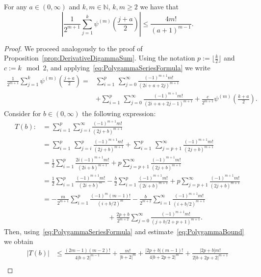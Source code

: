\documentclass[AHL,Unicode,longabstracts,published]{cedram}
\newcommand{\N}{\mathbb{N}}
\begin{document}
\begin{prop}\label{prop:DerivativeDigammaSumBound}
For any $a\in(0,\infty)$ and $k,m\in\N$, $k,m\ge 2$ we have that
\[
\left|\frac{1}{2^{m+1}}\sum\limits_{j=1}^k\psi^{(m)}\left(\frac{j+a}{2}\right)\right|\leq\frac{4m!}{(a+1)^{m-1}}.
\]
\end{prop}

\begin{proof}
We proceed analogously to the proof of Proposition~\ref{prop:DerivativeDigammaSum}. Using the notation $p:=\lfloor\frac{k}{2}\rfloor$ and $c:= k\mod 2$, and applying~\eqref{eq:PolygammaSeriesFormula} we write
\begin{align*}
\frac{1}{2^{m+1}}\sum\limits_{j=1}^k\psi^{(m)}\left(\frac{j+a}{2}\right)=&\sum\limits_{i=1}^p\,\sum\limits_{j=0}^{\infty}\frac{(-1)^{m+1}m!}{(2i+a+2j)^{m+1}}\\
&+\sum\limits_{i=1}^p\,\sum\limits_{j=0}^{\infty}\frac{(-1)^{m+1}m!}{(2i+a+2j-1)^{m+1}}+\frac{c}{2^{m+1}}\psi^{(m)}\left(\frac{k+a}{2}\right).
\end{align*}
Consider for $b\in(0,\infty)$ the following expression:
\begin{align*}
T(b):&=\sum\limits_{i=1}^p\sum\limits_{j=i}^{\infty}\frac{(-1)^{m+1}m!}{(2j+b)^{m+1}}\\
&=\sum\limits_{i=1}^p\,\sum\limits_{j=i}^{p}\frac{(-1)^{m+1}m!}{(2j+b)^{m+1}}+\sum\limits_{i=1}^p\,\sum\limits_{j=p+1}^{\infty}\frac{(-1)^{m+1}m!}{(2j+b)^{m+1}}\\
&=\frac12\sum\limits_{i=1}^p\frac{2i(-1)^{m+1}m!}{(2i+b)^{m+1}}+p\sum\limits_{j=p+1}^{\infty}\frac{(-1)^{m+1}m!}{(2j+b)^{m+1}}\\
&=\frac12\sum\limits_{i=1}^p\frac{(-1)^{m+1}m!}{(2i+b)^{m}}-\frac{b}{2}\sum\limits_{i=1}^p\frac{(-1)^{m+1}m!}{(2i+b)^{m+1}}+p\sum\limits_{j=p+1}^{\infty}\frac{(-1)^{m+1}m!}{(2j+b)^{m+1}}\\
&=-\frac{m}{2^{m+1}}\sum\limits_{i=1}^p\frac{(-1)^{m}(m-1)!}{(i+b/2)^m}-\frac{b}{2^{m+2}}\sum\limits_{i=1}^\infty\frac{(-1)^{m+1}m!}{(i+b/2)^{m+1}}\\
&\hspace{4cm}+\frac{2p+b}{2^{m+2}}\sum\limits_{j=0}^{\infty}\frac{(-1)^{m+1}m!}{(j+b/2+p+1)^{m+1}}.
\end{align*}
Then, using~\eqref{eq:PolygammaSeriesFormula} and estimate~\eqref{eq:PolygammaBound} we obtain
\begin{align*}
\left|T(b)\right|&\leq\frac{(2m-1)(m-2)!}{4|b+2|^{m-1}}+\frac{m!}{|b+2|^{m}}+\frac{|2p+b|(m-1)!}{4|b+2p+2|^{m}}+\frac{|2p+b|m!}{2|b+2p+2|^{m+1}}\\

\end{align*}
\end{proof}
\end{document}
